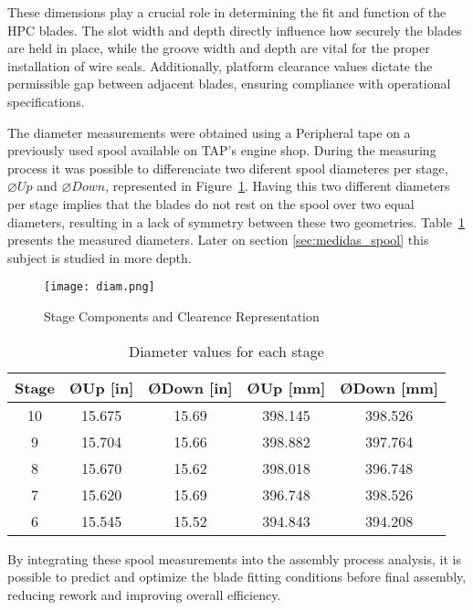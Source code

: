 These dimensions play a crucial role in determining the fit and function of the HPC blades. The slot width and depth directly influence how securely the blades are held in place, while the groove width and depth are vital for the proper installation of wire seals.
Additionally, platform clearance values dictate the permissible gap between adjacent blades, ensuring compliance with operational specifications.

The diameter measurements were obtained using a Peripheral tape on a previously used spool available on \gls{TAP}'s engine shop. 
During the measuring process it was possible to differenciate two diferent spool diameteres per stage,$\varnothing Up$ and $\varnothing Down$, represented in Figure~\ref{fig:diam.png}.
Having this two different diameters per stage implies that the blades do not rest on the spool over two equal diameters, resulting in a lack of symmetry between these two geometries.
Table~\ref{tab:diameters} presents the measured diameters. Later on section \ref{sec:medidas_spool} this subject is studied in more depth.

\begin{figure}[H]
    \centering
    \texttt{[image: diam.png]}
    \caption{Stage Components and Clearence Representation}
    \label{fig:diam.png}
\end{figure}


\begin{table}[h]
    \centering
    \begin{tabular}{ccccc}
        \hline
        Stage & ØUp [in] & ØDown [in] & ØUp [mm] & ØDown [mm]\\
        \hline
        10 & 15.675 & 15.69 & 398.145 & 398.526 \\
        9  & 15.704 & 15.66 & 398.882 & 397.764 \\
        8  & 15.670 & 15.62 & 398.018 & 396.748 \\
        7  & 15.620 & 15.69 & 396.748 & 398.526 \\
        6  & 15.545 & 15.52 & 394.843 & 394.208 \\
        \hline
    \end{tabular}
    \caption{Diameter values for each stage}
    \label{tab:diameters}
\end{table}

By integrating these spool measurements into the assembly process analysis, it is possible to predict and optimize the blade fitting conditions before final assembly, reducing rework and improving overall efficiency.

